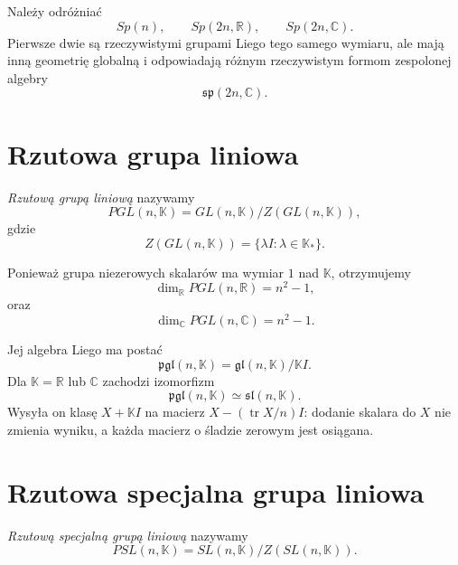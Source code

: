 Należy odróżniać
\[
Sp(n),
\qquad
Sp(2n,\mathbb R),
\qquad
Sp(2n,\mathbb C).
\]
Pierwsze dwie są rzeczywistymi grupami Liego tego samego wymiaru,
ale mają inną geometrię globalną i odpowiadają różnym rzeczywistym
formom zespolonej algebry
\[
\mathfrak{sp}(2n,\mathbb C).
\]



\section{Rzutowa grupa liniowa}
\label{sec:app-grupa-pgl}


\begin{definicja}
\emph{Rzutową grupą liniową} nazywamy
\[
PGL(n,\mathbb K)
=
GL(n,\mathbb K)/Z(GL(n,\mathbb K)),
\]
gdzie
\[
Z(GL(n,\mathbb K))
=
\{\lambda I:\lambda\in\mathbb K_*\}.
\]
\end{definicja}

Ponieważ grupa niezerowych skalarów ma wymiar $1$ nad $\mathbb K$,
otrzymujemy
\[
\dim_{\mathbb R}PGL(n,\mathbb R)=n^2-1,
\]
oraz
\[
\dim_{\mathbb C}PGL(n,\mathbb C)=n^2-1.
\]

Jej algebra Liego ma postać
\[
\mathfrak{pgl}(n,\mathbb K)
=
\mathfrak{gl}(n,\mathbb K)/\mathbb K I.
\]
Dla $\mathbb K=\mathbb R$ lub $\mathbb C$ zachodzi izomorfizm
\[
\mathfrak{pgl}(n,\mathbb K)
\simeq
\mathfrak{sl}(n,\mathbb K).
\]
Wysyła on klasę $X+\mathbb K I$ na macierz
$X-(\operatorname{tr}X/n)I$: dodanie skalara
do $X$ nie zmienia wyniku, a każda macierz
o śladzie zerowym jest osiągana.



\section{Rzutowa specjalna grupa liniowa}


\begin{definicja}
\emph{Rzutową specjalną grupą liniową} nazywamy
\[
PSL(n,\mathbb K)
=
SL(n,\mathbb K)/Z(SL(n,\mathbb K)).
\]
\end{definicja}

